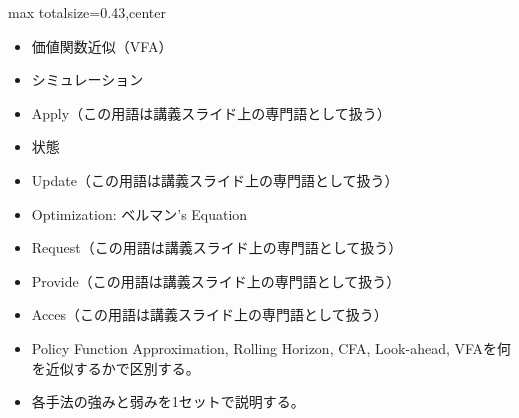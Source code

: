 \clearpage
{}
\begin{minipage}[t]{0.405\textwidth}
\begin{adjustbox}{max totalsize={\textwidth}{0.43\textheight},center}
\begin{minipage}{\textwidth}\scriptsize
{}\begin{itemize}
\item 価値関数近似（VFA）
\item シミュレーション
\item Apply（この用語は講義スライド上の専門語として扱う）
\item 状態
\item Update（この用語は講義スライド上の専門語として扱う）
\item Optimization: ベルマン’s Equation
\item Request（この用語は講義スライド上の専門語として扱う）
\item Provide（この用語は講義スライド上の専門語として扱う）
\item Acces（この用語は講義スライド上の専門語として扱う）
\end{itemize}\begin{itemize}
\item Policy Function Approximation, Rolling Horizon, CFA, Look-ahead, VFAを何を近似するかで区別する。
\item 各手法の強みと弱みを1セットで説明する。
\end{itemize}
\end{minipage}
\end{adjustbox}
\end{minipage}\hfill
